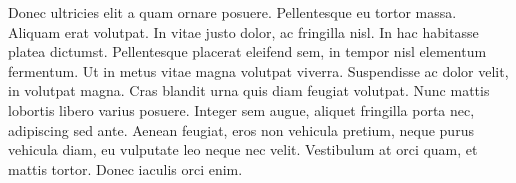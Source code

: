 Donec ultricies elit a quam ornare posuere. Pellentesque eu tortor massa. Aliquam erat volutpat. In vitae justo dolor, ac fringilla nisl. In hac habitasse platea dictumst. Pellentesque placerat eleifend sem, in tempor nisl elementum fermentum. Ut in metus vitae magna volutpat viverra. Suspendisse ac dolor velit, in volutpat magna. Cras blandit urna quis diam feugiat volutpat. Nunc mattis lobortis libero varius posuere. Integer sem augue, aliquet fringilla porta nec, adipiscing sed ante. Aenean feugiat, eros non vehicula pretium, neque purus vehicula diam, eu vulputate leo neque nec velit. Vestibulum at orci quam, et mattis tortor. Donec iaculis orci enim.
